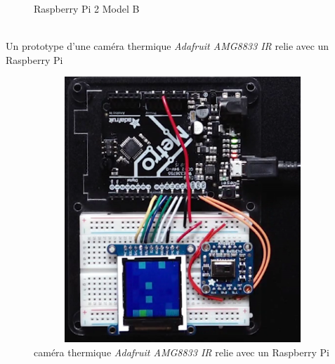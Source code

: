 \documentclass[12pt]{article}
\begin{document}
\begin{itemize}
\begin{figure}[h]
		\caption{Raspberry Pi 2 Model B}
	\end{figure}\\
	
	
	Un prototype d'une caméra thermique \textit{Adafruit AMG8833 IR} relie avec un Raspberry Pi 
	\begin{figure}[h]
				\centering
		\includegraphics[height=10cm,width=12cm]{img-Chapiter-3/therPi.png}
		\caption{caméra thermique \textit{Adafruit AMG8833 IR} relie avec un Raspberry Pi }
	\end{figure}
\end{itemize}
\newpage
\end{document}
